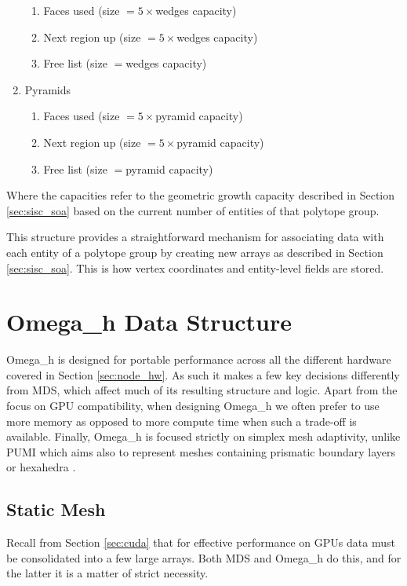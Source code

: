 \begin{enumerate}
  \begin{enumerate}
  \item Faces used (size $=5\times$wedges capacity)
  \item Next region up (size $=5\times$wedges capacity)
  \item Free list (size $=$wedges capacity)
  \end{enumerate}
\item Pyramids
  \begin{enumerate}
  \item Faces used (size $=5\times$pyramid capacity)
  \item Next region up (size $=5\times$pyramid capacity)
  \item Free list (size $=$pyramid capacity)
  \end{enumerate}
\end{enumerate}
Where the capacities refer to the geometric growth
capacity described in Section \ref{sec:sisc_soa} based
on the current number of entities of that polytope group.

This structure provides a straightforward mechanism for associating
data with each entity of a polytope group by creating
new arrays as described in Section \ref{sec:sisc_soa}.
This is how vertex coordinates and entity-level fields
are stored.

\section{Omega\_h Data Structure}
\label{sec:omega_h-struct}

Omega\_h is designed for portable performance across
all the different hardware covered in Section \ref{sec:node_hw}.
As such it makes a few key decisions differently from MDS,
which affect much of its resulting structure and logic.
Apart from the focus on GPU compatibility, when designing
Omega\_h we often prefer to use more memory as opposed
to more compute time when such a trade-off is available.
Finally, Omega\_h is focused strictly on simplex mesh
adaptivity, unlike PUMI which aims also to represent
meshes containing prismatic boundary layers \cite{ovcharenko2013parallel}
or hexahedra \cite{seol2006efficient}.

\subsection{Static Mesh}
\label{sec:osh_static}

Recall from Section \ref{sec:cuda} that for effective
performance on GPUs data must be consolidated into
a few large arrays.
Both MDS and Omega\_h do this, and for the latter it is
a matter of strict necessity.

